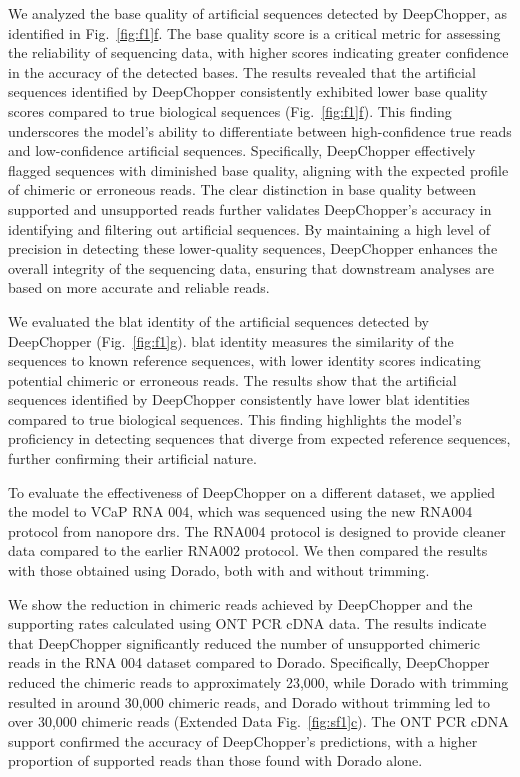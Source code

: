 \documentclass[pdflatex, sn-mathphys-num, lineno]{sn-jnl}%
\newcommand{\figref}[2]{Fig.~\hyperref[#1]{\ref*{#1}#2}}
\newcommand{\edfigref}[2]{Extended Data Fig.~\hyperref[#1]{\ref*{#1}#2}}
\theoremstyle{thmstyleone}%
\theoremstyle{thmstyletwo}%
\theoremstyle{thmstylethree}%
\begin{document}
We analyzed the base quality of artificial sequences detected by DeepChopper, as identified in \figref{fig:f1}{f}.
The base quality score is a critical metric for assessing the reliability of sequencing data, with higher scores indicating greater confidence in the accuracy of the detected bases.
The results revealed that the artificial sequences identified by DeepChopper consistently exhibited lower base quality scores compared to true biological sequences (\figref{fig:f1}{f}).
This finding underscores the model's ability to differentiate between high-confidence true reads and low-confidence artificial sequences.
Specifically, DeepChopper effectively flagged sequences with diminished base quality, aligning with the expected profile of chimeric or erroneous reads.
The clear distinction in base quality between supported and unsupported reads further validates DeepChopper's accuracy in identifying and filtering out artificial sequences.
By maintaining a high level of precision in detecting these lower-quality sequences, DeepChopper enhances the overall integrity of the sequencing data, ensuring that downstream analyses are based on more accurate and reliable reads.

We evaluated the \gls{blat} identity of the artificial sequences detected by DeepChopper (\figref{fig:f1}{g}).
\gls{blat} identity measures the similarity of the sequences to known reference sequences, with lower identity scores indicating potential chimeric or erroneous reads.
The results show that the artificial sequences identified by DeepChopper consistently have lower \gls{blat} identities compared to true biological sequences.
This finding highlights the model's proficiency in detecting sequences that diverge from expected reference sequences, further confirming their artificial nature.


To evaluate the effectiveness of DeepChopper on a different dataset, we applied the model to VCaP RNA 004, which was sequenced using the new RNA004 protocol from nanopore \gls{drs}.
The RNA004 protocol is designed to provide cleaner data compared to the earlier RNA002 protocol.
We then compared the results with those obtained using Dorado, both with and without trimming.

We show the reduction in chimeric reads achieved by DeepChopper and the supporting rates calculated using ONT PCR cDNA data.
The results indicate that DeepChopper significantly reduced the number of unsupported chimeric reads in the RNA 004 dataset compared to Dorado.
Specifically, DeepChopper reduced the chimeric reads to approximately 23,000, while Dorado with trimming resulted in around 30,000 chimeric reads, and Dorado without trimming led to over 30,000 chimeric reads (\edfigref{fig:sf1}{c}).
The ONT PCR cDNA support confirmed the accuracy of DeepChopper's predictions, with a higher proportion of supported reads than those found with Dorado alone.
\end{document}
